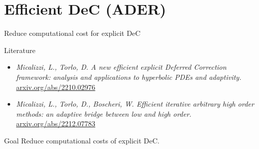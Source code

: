 \documentclass[9pt,compress,t,aspectratio=169]{beamer}
\begin{document}
\section{Efficient DeC (ADER)}
\begin{frame}{Reduce computational cost for explicit DeC}
	\begin{block}{Literature}
		\small
		\begin{itemize}
			\item \textit{Micalizzi, L., Torlo, D. A new efficient explicit Deferred Correction framework: analysis and applications to hyperbolic PDEs and adaptivity.}
			\href{https://arxiv.org/abs/2210.02976}{arxiv.org/abs/2210.02976}
			\item \textit{Micalizzi, L., Torlo, D., Boscheri, W. Efficient iterative arbitrary high order methods: an adaptive bridge between low and high order.} \href{https://arxiv.org/abs/2212.07783}{arxiv.org/abs/2212.07783} 
		\end{itemize}
	\end{block}	

	\begin{block}{Goal}
		Reduce computational costs of explicit DeC.
	\end{block}
	
\end{frame}
\end{document}
